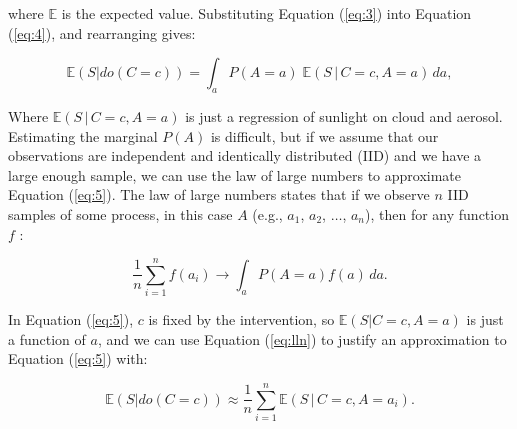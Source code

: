 \documentclass[12pt]{article}
\begin{document}
where $\mathbb{E}$ is the expected value. Substituting Equation
(\ref{eq:3}) into Equation (\ref{eq:4}), and rearranging gives:

\begin{equation}
  \mathbb{E}(S | do(C = c))  = \int_{a} P(A=a) \; \mathbb{E}(S \, | \,
  C=c, A=a) \, d a,
  \label{eq:5}
\end{equation}

Where $\mathbb{E}(S \, | \, C=c, A=a)$ is just a regression of sunlight on
cloud and aerosol. Estimating the marginal $P(A)$ is difficult, but
if we assume that our observations are independent and identically
distributed (IID) and we have a large enough sample, we can use the
law of large numbers to approximate Equation (\ref{eq:5}). The law of
large numbers states that if we observe $n$ IID samples of some process, in
this case $A$ (e.g., $a_1$, $a_2$, $\ldots$, $a_n$), then for any
function $f$ \citep{shalizi2013}:

\begin{equation}
  \frac{1}{n} \sum_{i=1}^n f(a_i) \to \int_a P(A=a) f(a) \, d a.
  \label{eq:lln}
\end{equation}

In Equation (\ref{eq:5}), $c$ is fixed by the intervention, so
$\mathbb{E}(S| C=c, A=a)$ is just a function of $a$, and we can use
Equation (\ref{eq:lln}) to justify an approximation to Equation
(\ref{eq:5}) with:

\begin{equation}
  \mathbb{E}(S | do(C = c))  \approx \frac{1}{n} \sum_{i=1}^n
  \mathbb{E}(S \, | \,
  C=c, A=a_i).
  \label{eq:6}
\end{equation}
\end{document}
